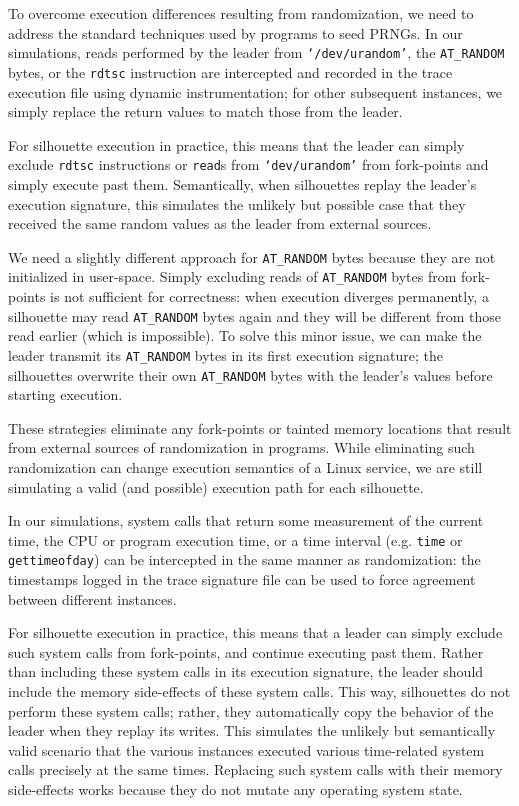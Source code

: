  \newline
To overcome execution differences resulting from randomization,
we need to address the standard techniques
used by programs to seed PRNGs.
In our simulations, reads performed by the leader from \texttt{`/dev/urandom'}, the
\texttt{AT\_RANDOM} bytes, or the \texttt{rdtsc} instruction 
are intercepted and recorded in the trace execution file using
dynamic instrumentation;
for other subsequent instances, we simply
replace the return values to match
those from the leader.

For silhouette execution in practice, this means that the leader can simply
exclude \texttt{rdtsc} instructions 
or \texttt{read}s from \texttt{`dev/urandom'}
from fork-points and simply execute past them. 
Semantically, when silhouettes replay 
the leader's execution signature, this simulates
the unlikely but possible case that they
received the same random values as the leader
from external sources.

We need a slightly different approach for \texttt{AT\_RANDOM} bytes because they
are not initialized in user-space.
Simply excluding reads 
of \texttt{AT\_RANDOM} bytes from fork-points
is not sufficient for correctness:
when execution diverges permanently,
a silhouette may read \texttt{AT\_RANDOM}
bytes again and they will be different 
from those read earlier (which is impossible). 
To solve this minor issue, we can make the leader transmit
its \texttt{AT\_RANDOM} bytes
in its first execution signature;
the silhouettes overwrite
their own \texttt{AT\_RANDOM}
bytes with the leader's values
before starting execution.

These strategies eliminate
any fork-points or tainted memory
locations that result
from external
sources of randomization
in programs. While
eliminating such randomization
can change execution
semantics of a Linux service,
we are still simulating a valid
(and possible) execution path
for each silhouette. \newline

 \newline
In our simulations, 
system calls that return 
some measurement of the 
current time, the CPU or program execution time, or a time interval 
(e.g. \texttt{time} or \texttt{gettimeofday})
can be intercepted in the same manner
as randomization:
the timestamps logged
in the trace signature file
can be used to force agreement
between different instances.

For silhouette execution in practice, this means that a leader can simply
exclude such system calls from fork-points,
and continue executing past them. 
Rather than including these system calls in its
execution signature, the leader should include
the memory side-effects of these system calls.
This way, silhouettes do not perform these system calls; rather, they
automatically copy the behavior of the leader when they replay its 
writes. This simulates the unlikely 
but semantically valid scenario
that the various instances
executed various time-related system calls
precisely at the same times.
Replacing such system calls with their memory side-effects
works because they do not mutate any operating system
state.

